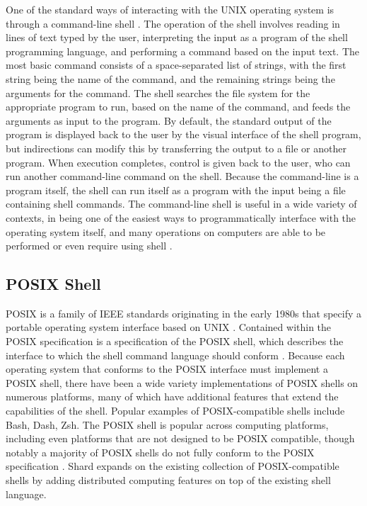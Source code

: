 \documentclass[oneside]{report}
\begin{document}
One of the standard ways of interacting with the UNIX operating system is through a command-line shell \cite{10.1145/361011.361061}.
The operation of the shell involves reading in lines of text typed by the user, interpreting the input as a program of the shell programming language, and performing a command based on the input text.
The most basic command consists of a space-separated list of strings, with the first string being the name of the command, and the remaining strings being the arguments for the command.
The shell searches the file system for the appropriate program to run, based on the name of the command, and feeds the arguments as input to the program.
By default, the standard output of the program is displayed back to the user by the visual interface of the shell program, but indirections can modify this by transferring the output to a file or another program.
When execution completes, control is given back to the user, who can run another command-line command on the shell.
Because the command-line is a program itself, the shell can run itself as a program with the input being a file containing shell commands.
The command-line shell is useful in a wide variety of contexts, in being one of the easiest ways to programmatically interface with the operating system itself, and many operations on computers are able to be performed or even require using shell \cite{10.1145/3371111}.

\subsection{POSIX Shell}
POSIX is a family of IEEE standards originating in the early 1980s that specify a portable operating system interface based on UNIX \cite{10.1145/210308.210315}.
Contained within the POSIX specification is a specification of the POSIX shell, which describes the interface to which the shell command language should conform \cite{posix2017}.
Because each operating system that conforms to the POSIX interface must implement a POSIX shell, there have been a wide variety implementations of POSIX shells on numerous platforms, many of which have additional features that extend the capabilities of the shell.
Popular examples of POSIX-compatible shells include Bash, Dash, Zsh.
The POSIX shell is popular across computing platforms, including even platforms that are not designed to be POSIX compatible, though notably a majority of POSIX shells do not fully conform to the POSIX specification \cite{10.1145/3371111}.
Shard expands on the existing collection of POSIX-compatible shells by adding distributed computing features on top of the existing shell language.
\end{document}
